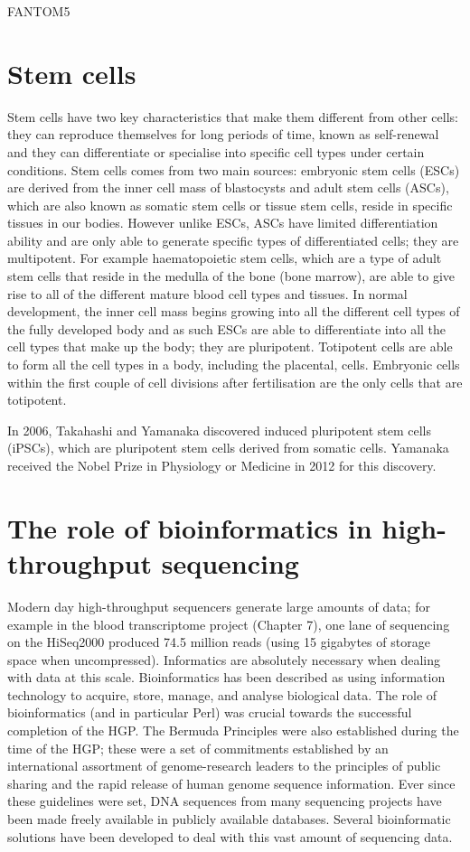 FANTOM5\cite{pmid24670764}

\section{Stem cells}

Stem cells have two key characteristics that make them different from other cells: they can reproduce themselves for long periods of time, known as self-renewal and they can differentiate or specialise into specific cell types under certain conditions. Stem cells comes from two main sources: embryonic stem cells (ESCs) are derived from the inner cell mass of blastocysts and adult stem cells (ASCs), which are also known as somatic stem cells or tissue stem cells, reside in specific tissues in our bodies. However unlike ESCs, ASCs have limited differentiation ability and are only able to generate specific types of differentiated cells; they are multipotent. For example haematopoietic stem cells, which are a type of adult stem cells that reside in the medulla of the bone (bone marrow), are able to give rise to all of the different mature blood cell types and tissues. In normal development, the inner cell mass begins growing into all the different cell types of the fully developed body and as such ESCs are able to differentiate into all the cell types that make up the body; they are pluripotent. Totipotent cells are able to form all the cell types in a body, including the placental, cells. Embryonic cells within the first couple of cell divisions after fertilisation are the only cells that are totipotent.

In 2006, Takahashi and Yamanaka discovered induced pluripotent stem cells (iPSCs)\cite{pmid16904174}, which are pluripotent stem cells derived from somatic cells. Yamanaka received the Nobel Prize in Physiology or Medicine in 2012 for this discovery.

\section{The role of bioinformatics in high-throughput sequencing}

Modern day high-throughput sequencers generate large amounts of data; for example in the blood transcriptome project (Chapter 7), one lane of sequencing on the HiSeq2000 produced 74.5 million reads (using 15 gigabytes of storage space when uncompressed). Informatics are absolutely necessary when dealing with data at this scale. Bioinformatics has been described as using information technology to acquire, store, manage, and analyse biological data. The role of bioinformatics (and in particular Perl) was crucial towards the successful completion of the HGP\cite{stein1996perl}. The Bermuda Principles were also established during the time of the HGP; these were a set of commitments established by an international assortment of genome-research leaders to the principles of public sharing and the rapid release of human genome sequence information. Ever since these guidelines were set, DNA sequences from many sequencing projects have been made freely available in publicly available databases. Several bioinformatic solutions have been developed to deal with this vast amount of sequencing data.

